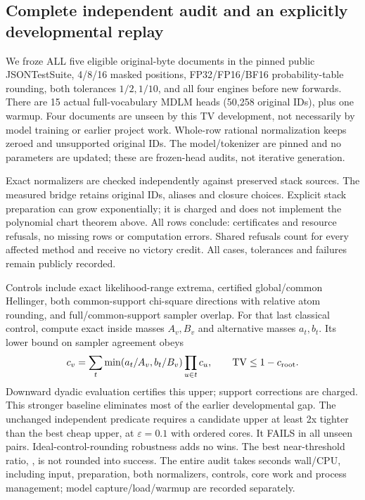 \documentclass[11pt]{article}
\newcommand{\TV}{\operatorname{TV}}
\begin{document}
\subsection{Complete independent audit and an explicitly developmental replay}
We froze ALL five eligible original-byte documents in the pinned public
JSONTestSuite, 4/8/16 masked positions, FP32/FP16/BF16 probability-table rounding,
both tolerances $1/2,1/10$, and all four engines before new forwards.
There are 15 actual full-vocabulary MDLM heads (50,258 original IDs), plus one
warmup. Four documents are unseen by this TV development, not necessarily by
model training or earlier project work. Whole-row rational normalization keeps
zeroed and unsupported original IDs. The model/tokenizer are pinned and no
parameters are updated; these are frozen-head audits, not iterative generation.

Exact normalizers are checked independently against preserved stack sources.
The measured bridge retains original IDs, aliases and closure choices.
Explicit stack preparation can grow exponentially; it is charged and does
not implement the polynomial chart theorem above. All \ExternalRows{} rows conclude:
\ExternalCertificates{} certificates and \ExternalRefusals{} resource refusals, no missing rows or computation
errors. Shared refusals count for every affected method and receive no victory
credit. All cases, tolerances and failures remain publicly recorded.

Controls include exact likelihood-range extrema, certified global/common
Hellinger, both common-support chi-square directions with relative atom
rounding, and full/common-support sampler overlap. For that last classical
control, compute exact inside masses $A_v,B_v$ and alternative masses
$a_t,b_t$. Its lower bound on sampler agreement obeys
\[
 c_v=\sum_t\min(a_t/A_v,b_t/B_v)\prod_{u\in t}c_u,
 \qquad \TV\leq1-c_{\rm root}.
\]
Downward dyadic evaluation certifies this upper; support corrections are
charged. This stronger baseline eliminates most of the earlier developmental
gap. The unchanged independent predicate requires a candidate upper at least
2x tighter than the best cheap upper, at $\varepsilon=0.1$ with ordered cores.
It FAILS in all \IndependentPairs{} unseen pairs. Ideal-control-rounding robustness adds no
wins. The best near-threshold ratio, \ClosestIndependentRatio{}, is not rounded into success.
The entire audit takes \ExternalWall{} seconds wall/CPU, including input,
preparation, both normalizers, controls, core work and process management;
model capture/load/warmup are recorded separately.
\end{document}
